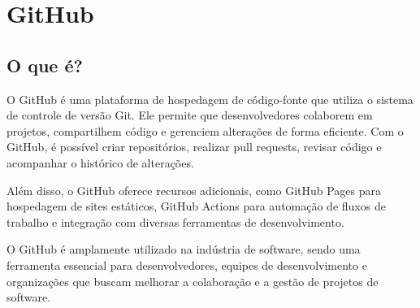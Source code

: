 \chapter{GitHub}
\par
\section{O que é?}
O GitHub é uma plataforma de hospedagem de código-fonte que utiliza o sistema de controle de versão Git. Ele permite que desenvolvedores colaborem em projetos, compartilhem código e gerenciem alterações de forma eficiente. Com o GitHub, é possível criar repositórios, realizar pull requests, revisar código e acompanhar o histórico de alterações.
\par
Além disso, o GitHub oferece recursos adicionais, como GitHub Pages para hospedagem de sites estáticos, GitHub Actions para automação de fluxos de trabalho e integração com diversas ferramentas de desenvolvimento.
\par
O GitHub é amplamente utilizado na indústria de software, sendo uma ferramenta essencial para desenvolvedores, equipes de desenvolvimento e organizações que buscam melhorar a colaboração e a gestão de projetos de software.
\par
